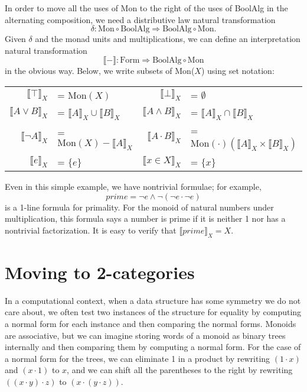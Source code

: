 \documentclass{llncs}
\newcommand{\interp}[1]{\llbracket #1 \rrbracket}
\newcommand{\maps}{\colon}
\renewcommand{\:}{\colon}
\newcommand{\Mon}{\mathrm{Mon}}
\newcommand{\BoolAlg}{\mathrm{BoolAlg}}
\renewcommand{\Form}{\mathrm{Form}}
\begin{document}
In order to move all the uses of Mon to the right of the uses of BoolAlg in the alternating composition, we need a distributive law natural transformation
\[ \delta\maps \Mon \circ \BoolAlg \Rightarrow \BoolAlg \circ \Mon. \]
Given $\delta$ and the monad units and multiplications, we can define an interpretation natural transformation
\[ \interp{-}\maps \Form\Rightarrow \BoolAlg \circ \Mon \]
in the obvious way.  Below, we write subsets of Mon($X$) using set notation:
\begin{center}
  \begin{longtable}{|rl|rl|}
    \hline
    $\interp{\top}_X$ &= $\Mon(X)$ &
    $\interp{\bot}_X$ &= $\emptyset$ \\
    $\interp{{A}\lor{B}}_X$ &= $\interp{A}_X \cup \interp{B}_X$ &
    $\interp{{A}\land{B}}_X$ &= $\interp{A}_X \cap \interp{B}_X$\\
    $\interp{\neg A}_X$ &= $\Mon(X) - \interp{A}_X$ &
    $\interp{{A} \cdot {B}}_X$ &= $\Mon(\cdot)(\interp{A}_X \times \interp{B}_X)$\\
    $\interp{e}_X$ &= $\{ e\}$ &
    $\interp{x \in X}_X$ &= $\{ x\}$\\
    \hline
  \end{longtable}
\end{center}

Even in this simple example, we have nontrivial formulae; for example,
\[ prime = \neg e \land \neg(\neg e \cdot \neg e) \]
is a 1-line formula for primality.  For the monoid of natural numbers under multiplication, this formula says a number is prime if it is neither 1 nor has a nontrivial factorization.  It is easy to verify that $\interp{prime}_X = X.$

\section{Moving to 2-categories}

In a computational context, when a data structure has some symmetry we do not care about, we often test two instances of the structure for equality by computing a normal form for each instance and then comparing the normal forms.  Monoids are associative, but we can imagine storing words of a monoid as binary trees internally and then comparing them by computing a normal form.  For the case of a normal form for the trees, we can eliminate 1 in a product by rewriting $(1 \cdot x)$ and $(x \cdot 1)$ to $x$, and we can shift all the parentheses to the right by rewriting $((x \cdot y) \cdot z)$ to $(x \cdot (y \cdot z)).$
\end{document}
